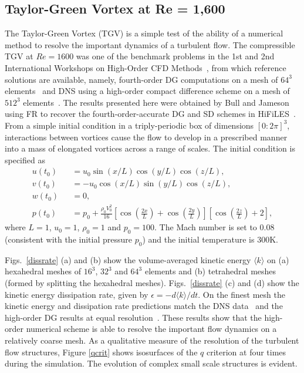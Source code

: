 \graphicspath{{figures_taylorgreen/}}%

\subsection{Taylor-Green Vortex at Re = 1,600}

The Taylor-Green Vortex (TGV) is a simple test of the ability of a numerical method to resolve the important dynamics of a turbulent flow.
The compressible TGV at $Re=1600$ was one of the benchmark problems in the 1st and 2nd International Workshops on High-Order CFD Methods~\cite{hiocfd12,hiocfd13}, from which reference solutions are available, namely, fourth-order DG computations on a mesh of $64^3$ elements~\cite{beck:12} and DNS using a high-order compact difference scheme on a mesh of $512^3$ elements~\cite{debonis:13}.
The results presented here were obtained by Bull and Jameson using FR to recover the fourth-order-accurate DG and SD schemes in HiFiLES~\cite{bull2013a,bull2014a}.
From a simple initial condition in a triply-periodic box of dimensions $[0:2\pi]^3$, interactions between vortices cause the flow to develop in a prescribed manner into a mass of elongated vortices across a range of scales.
The initial condition is specified as
%
\begin{eqnarray}\label{tgv}
u(t_0) &&= u_0 \sin (x/L) \cos (y/L) \cos (z/L), \\
v(t_0) &&= -u_0 \cos (x/L) \sin (y/L) \cos (z/L), \\
w(t_0) &&= 0, \\
p(t_0) &&= p_0 + \frac{\rho_0 V^2_0}{16} \left [ \cos \left (\frac{2x}{L} \right ) + \cos \left (\frac{2y}{L} \right ) \right ] \left [ \cos \left (\frac{2z}{L} \right ) + 2 \right ],
\end{eqnarray}
%
where $L = 1$, $u_0 = 1$, $\rho_0 = 1$ and $p_0 = 100$.
The Mach number is set to 0.08 (consistent with the initial pressure $p_0$) and the initial temperature is 300K.

Figs.~\ref{dissrate} (a) and (b) show the volume-averaged kinetic energy $\langle k \rangle$  on (a) hexahedral meshes of $16^3$, $32^3$ and $64^3$ elements and (b) tetrahedral meshes (formed by splitting the hexahedral meshes).
Figs.~\ref{dissrate} (c) and (d) show the kinetic energy dissipation rate, given by $\epsilon = -d \langle k \rangle/dt$.
On the finest mesh the kinetic energy and dissipation rate predictions match the DNS data~\cite{debonis:13} and the high-order DG results at equal resolution~\cite{beck:12}.
These results show that the high-order numerical scheme is able to resolve the important flow dynamics on a relatively coarse mesh.
As a qualitative measure of the resolution of the turbulent flow structures, Figure \ref{qcrit} shows isosurfaces of the $q$ criterion at four times during the simulation.
The evolution of complex small scale structures is evident.

